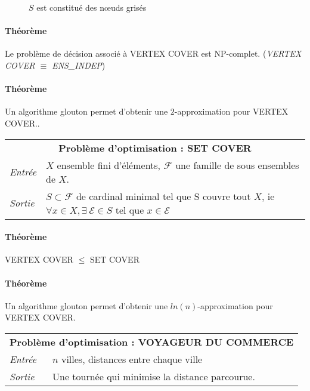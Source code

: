 \documentclass[french]{article}
\begin{document}
\begin{figure}[H]
\begin{subfigure}[b]{0.3\textwidth}
\end{subfigure}

\caption{$S$ est constitué des nœuds grisés}
\end{figure}

\paragraph{Théorème} Le problème de décision associé à VERTEX COVER est NP-complet. (\emph{VERTEX COVER $\equiv$ ENS\_INDEP})


\paragraph{Théorème} Un algorithme glouton permet d’obtenir une $2$-approximation pour VERTEX COVER..

\vspace{0.5cm}
\begin{tabularx}{\textwidth}{p{1cm}X}
\multicolumn{2}{c}{\textbf{Problème d’optimisation : SET COVER}} \\ 
\emph{Entrée} & $X$ ensemble fini d’éléments, $\mathcal{F}$ une famille de sous ensembles de $X$.\\ 
\emph{Sortie} & $S \subset \mathcal{F}$ de cardinal minimal tel que S couvre tout $X$, ie $\forall x \in X, \exists ~ \mathcal{E} \in S $ tel que $x \in \mathcal{E}$\\
\end{tabularx}

\paragraph{Théorème} VERTEX COVER $\leq$ SET COVER


\paragraph{Théorème} Un algorithme glouton permet d’obtenir une $ln(n)$-approximation pour VERTEX COVER.


\vspace{0.5cm}
\begin{tabularx}{\textwidth}{p{1cm}X}
\multicolumn{2}{c}{\textbf{Problème d’optimisation : VOYAGEUR DU COMMERCE}} \\ 
\emph{Entrée} & $n$ villes, distances entre chaque ville\\ 
\emph{Sortie} & Une tournée qui minimise la distance parcourue.\\
\end{tabularx}
\end{document}
